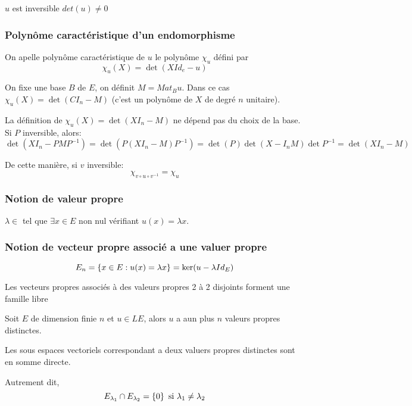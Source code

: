 $u$ est inversible \ssi $det(u) \neq 0$

\subsubsection{Polynôme caractéristique d'un endomorphisme}

On apelle polynôme caractéristique de $u$ le polynôme  $\chi_u$ défini par %
$$\chi_u(X) = \det (X Id_e - u)$$

On fixe une base $B$ de $E$, on définit $M = Mat_B u$.
Dans ce cas $\chi_u(X) = \det (CI_n -M)$
(c'est un polynôme de $X$ de degré $n$ unitaire).

La définition de $\chi_u(X) = \det (XI_n-M)$ ne dépend pas du choix de la base.
Si $P$ inversible, alors:
$$ \det (XI_n - PMP^{-1}) = \det (P(XI_n -M) P^{-1}) = \det (P) \det (X-I_nM)\det P^{-1} = \det (XI_n -M)$$


De cette manière, si $v$ inversible:
$$ \chi_{v\circ u \circ v^{-1}} = \chi_{u}$$


\subsubsection{Notion de valeur propre}

$\lambda \in $ tel que $\exists x \in E$ non nul vérifiant $u(x) = \lambda x$.

\subsubsection{Notion de vecteur propre associé a une valuer propre}


$$E_n = \left\{ x \in E: u (x) = \lambda x \right\} = \ker (u - \lambda Id_E) $$

\begin{prop}
	Les vecteurs propres associés à des valeurs propres 2 à 2 disjoints forment une famille libre
\end{prop}

\begin{coro}
	Soit $E$ de dimension finie $n$ et $u \in LE$, alors $u$ a aun plus $n$ valeurs propres distinctes.
\end{coro}


\begin{prop}
	Les sous espaces vectoriels correspondant a deux valuers propres distinctes sont en somme directe.

	Autrement dit,
	$$E_{\lambda_1} \cap E_{\lambda_2} = \left\{0\right\} \text { si } \lambda_1 \neq \lambda_2$$
\end{prop}

